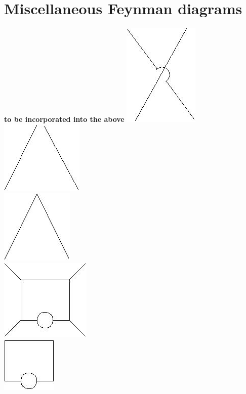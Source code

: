 \documentclass{article}
\begin{document}
\section{Miscellaneous Feynman diagrams}
\textbf{to be incorporated into the above}
\includegraphics[scale=0.3]{OPE/1.jpg}\\
\includegraphics[scale=0.3]{OPE/2.jpg}\\
\includegraphics[scale=0.3]{OPE/3.jpg}\\
\includegraphics[scale=0.3]{OPE/4.jpg}\\
\includegraphics[scale=0.3]{OPE/5.jpg}\\
\end{document}
